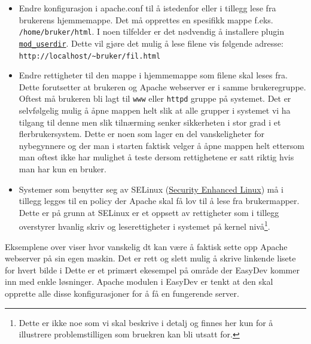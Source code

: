 \begin{itemize}
\item Endre konfigurasjon i apache.conf til å istedenfor eller i tillegg lese fra brukerens hjemmemappe. Det må opprettes en spesifikk mappe f.eks. \texttt{/home/bruker/html}. 
I noen tilfelder er det nødvendig å installere plugin \href{http://httpd.apache.org/docs/2.2/mod/mod_userdir.html}{\texttt{mod\_{}userdir}}. Dette vil gjøre det mulig å lese filene vis følgende adresse: \texttt{http://localhost/\~{}bruker/fil.html}

\item Endre rettigheter til den mappe i hjemmemappe som filene skal leses fra. Dette forutsetter at brukeren og Apache webserver er i samme brukeregruppe. Oftest må brukeren bli lagt til \texttt{www} eller \texttt{httpd} gruppe på systemet. Det er selvfølgelig mulig å åpne mappen helt slik at alle grupper i systemet vi ha tilgang til denne men slik tilnærming senker sikkerheten i stor grad i et flerbrukersystem. Dette er noen som lager en del vanskeligheter for nybegynnere og der man i starten faktisk velger å åpne mappen helt ettersom man oftest ikke har mulighet å teste dersom rettighetene er satt riktig hvis man har kun en bruker.

\item Systemer som benytter seg av SELinux (\href{http://en.wikipedia.org/wiki/Security-Enhanced_Linux}{Security Enhanced Linux}) må i tillegg legges til en policy der Apache skal få lov til å lese fra brukermapper. Dette er på grunn at SELinux er et oppsett av rettigheter som i tillegg overstyrer hvanlig skriv og leserettigheter i systemet på kernel nivå\footnote{Dette er ikke noe som vi skal beskrive i detalj og finnes her kun for å illustrere problemstilligen som bruekren kan bli utsatt for.}. 
\end{itemize}

Eksemplene over viser hvor vanskelig dt kan være å faktisk sette opp Apache webserver på sin egen maskin. Det er rett og slett mulig å skrive linkende lisete for hvert bilde i 
Dette er et primært ekesempel på område der EasyDev kommer inn med enkle løsninger. Apache modulen i EasyDev er tenkt at den skal opprette alle disse konfigurasjoner for å få en fungerende server.

